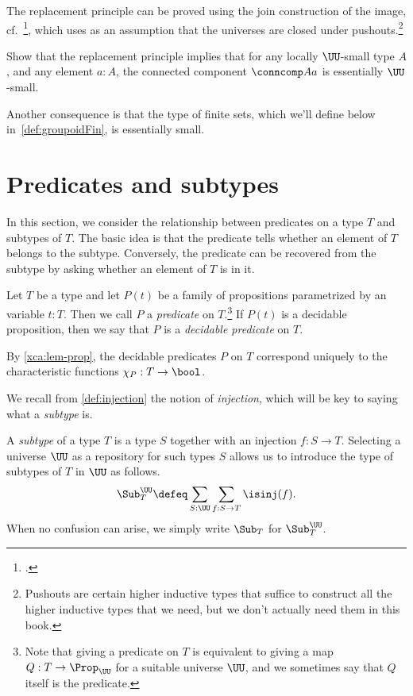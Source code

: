 The replacement principle can be proved using the join construction of the image, cf.~\citeauthor{Rijke-Join}\footcite{Rijke-Join},
which uses as an assumption that the universes
are closed under pushouts.\footnote{%
  Pushouts are certain higher inductive types that suffice
  to construct all the higher inductive types that we need,
  but we don't actually need them in this book.}
\begin{xca}\label{xca:comp-loc-small-ess-small}
  Show that the replacement principle implies that for any locally $\UU$-small type $A$,
  and any element $a:A$,
  the connected component $\conncomp A a$ is essentially $\UU$-small.
\end{xca}
Another consequence is that the type of finite sets, which we'll define below
in~\cref{def:groupoidFin}, is essentially small.


\section{Predicates and subtypes}
\label{sec:subtype}

In this section, we consider the relationship between predicates on a type $T$
and subtypes of $T$.  The basic idea is that the predicate tells
whether an element of $T$ belongs to the subtype. Conversely,
the predicate can be recovered from the subtype by asking whether an element of $T$
is in it.

\begin{definition}\label{def:predicate}
  Let $T$ be a type and let $P(t)$ be a family of propositions
  parametrized by an variable $t:T$.
  Then we call $P$ a \emph{predicate} on $T$.\footnote{%
    Note that giving a predicate on $T$ is
    equivalent to giving a map $Q: T\to\Prop_\UU$ for a suitable universe $\UU$,
    and we sometimes say that $Q$ itself is the predicate.}
  If $P(t)$ is a decidable proposition,
  then we say that $P$ is a \emph{decidable predicate} on $T$.
\end{definition}

By \cref{xca:lem-prop}, the decidable predicates $P$ on $T$
correspond uniquely to the characteristic functions $\chi_P:T\to\bool$.

We recall from \cref{def:injection} the notion of \emph{injection},
which will be key to saying what a \emph{subtype} is.


\begin{definition}\label{def:subtype}
  A \emph{subtype} of a type $T$
  is a type $S$ together with an injection
  $f : S \to T$.  Selecting a universe $\UU$ as a repository for such types $S$ allows us to introduce
  the type of subtypes of $T$ in $\UU$ as follows.
  \[
  \Sub^\UU_T \defeq \sum_{S:\UU}\sum_{f:S\to T}\isinj(f).
  \]
  When no confusion can arise, we simply write $\Sub_T$ for $\Sub^\UU_T$.
\end{definition}

